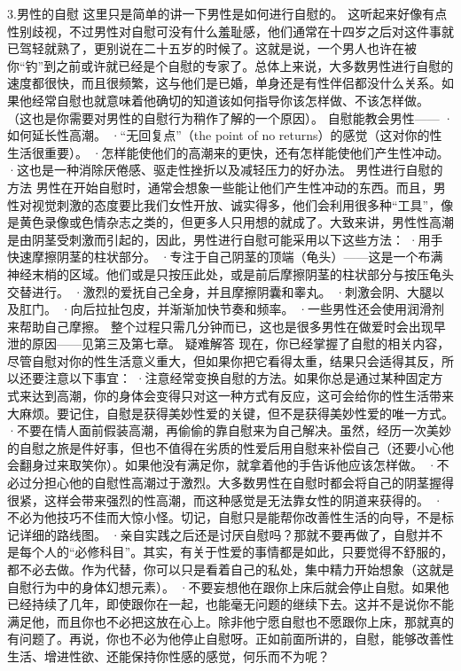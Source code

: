 \documentclass[12pt,UTF8]{ctexbook}
\begin{document}
3.男性的自慰
这里只是简单的讲一下男性是如何进行自慰的。
这听起来好像有点性别歧视，不过男性对自慰可没有什么羞耻感，他们通常在十四岁之后对这件事就已驾轻就熟了，更别说在二十五岁的时候了。这就是说，一个男人也许在被你“钓”到之前或许就已经是个自慰的专家了。总体上来说，大多数男性进行自慰的速度都很快，而且很频繁，这与他们是已婚，单身还是有性伴侣都没什么关系。如果他经常自慰也就意味着他确切的知道该如何指导你该怎样做、不该怎样做。
（这也是你需要对男性的自慰行为稍作了解的一个原因）。
自慰能教会男性——
·如何延长性高潮。
·“无回复点”（the point of no returns）的感觉（这对你的性生活很重要）。
·怎样能使他们的高潮来的更快，还有怎样能使他们产生性冲动。
·这也是一种消除厌倦感、驱走性挫折以及减轻压力的好办法。
男性进行自慰的方法
男性在开始自慰时，通常会想象一些能让他们产生性冲动的东西。而且，男性对视觉刺激的态度要比我们女性开放、诚实得多，他们会利用很多种“工具”，像是黄色录像或色情杂志之类的，但更多人只用想的就成了。大致来讲，男性性高潮是由阴茎受刺激而引起的，因此，男性进行自慰可能采用以下这些方法：
·用手快速摩擦阴茎的柱状部分。
·专注于自己阴茎的顶端（龟头）——这是一个布满神经末梢的区域。他们或是只按压此处，或是前后摩擦阴茎的柱状部分与按压龟头交替进行。
·激烈的爱抚自己全身，并且摩擦阴囊和睾丸。
·刺激会阴、大腿以及肛门。
·向后拉扯包皮，并渐渐加快节奏和频率。
·一些男性还会使用润滑剂来帮助自己摩擦。
整个过程只需几分钟而已，这也是很多男性在做爱时会出现早泄的原因——见第三及第七章。
疑难解答
现在，你已经掌握了自慰的相关内容，尽管自慰对你的性生活意义重大，但如果你把它看得太重，结果只会适得其反，所以还要注意以下事宜：
·注意经常变换自慰的方法。如果你总是通过某种固定方式来达到高潮，你的身体会变得只对这一种方式有反应，这可会给你的性生活带来大麻烦。要记住，自慰是获得美妙性爱的关键，但不是获得美妙性爱的唯一方式。
·不要在情人面前假装高潮，再偷偷的靠自慰来为自己解决。虽然，经历一次美妙的自慰之旅是件好事，但也不值得在劣质的性爱后用自慰来补偿自己（还要小心他会翻身过来取笑你）。如果他没有满足你，就拿着他的手告诉他应该怎样做。
·不必过分担心他的自慰性高潮过于激烈。大多数男性在自慰时都会将自己的阴茎握得很紧，这样会带来强烈的性高潮，而这种感觉是无法靠女性的阴道来获得的。
·不必为他技巧不佳而大惊小怪。切记，自慰只是能帮你改善性生活的向导，不是标记详细的路线图。
·亲自实践之后还是讨厌自慰吗？那就不要再做了，自慰并不是每个人的“必修科目”。其实，有关于性爱的事情都是如此，只要觉得不舒服的，都不必去做。作为代替，你可以只是看着自己的私处，集中精力开始想象（这就是自慰行为中的身体幻想元素）。
·不要妄想他在跟你上床后就会停止自慰。如果他已经持续了几年，即使跟你在一起，也能毫无问题的继续下去。这并不是说你不能满足他，而且你也不必把这放在心上。除非他宁愿自慰也不愿跟你上床，那就真的有问题了。再说，你也不必为他停止自慰呀。正如前面所讲的，自慰，能够改善性生活、增进性欲、还能保持你性感的感觉，何乐而不为呢？
\end{document}
